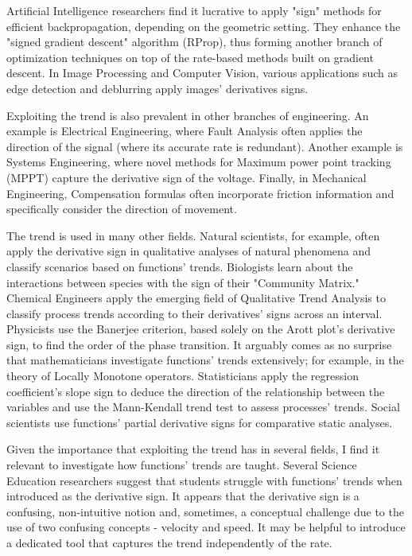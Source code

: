 \documentclass[11pt]{book}
\begin{document}
Artificial Intelligence researchers find it lucrative to apply "sign" methods for efficient backpropagation, depending on the geometric setting. They enhance the "signed gradient descent" algorithm (RProp), thus forming another branch of optimization techniques on top of the rate-based methods built on gradient descent. In Image Processing and Computer Vision, various applications such as edge detection and deblurring apply images' derivatives signs.

Exploiting the trend is also prevalent in other branches of engineering. An example is Electrical Engineering, where Fault Analysis often applies the direction of the signal (where its accurate rate is redundant). Another example is Systems Engineering, where novel methods for Maximum power point tracking (MPPT) capture the derivative sign of the voltage. Finally, in Mechanical Engineering, Compensation formulas often incorporate friction information and specifically consider the direction of movement.

The trend is used in many other fields. Natural scientists, for example, often apply the derivative sign in qualitative analyses of natural phenomena and classify scenarios based on functions' trends. Biologists learn about the interactions between species with the sign of their "Community Matrix." Chemical Engineers apply the emerging field of Qualitative Trend Analysis to classify process trends according to their derivatives' signs across an interval. Physicists use the Banerjee criterion, based solely on the Arott plot's derivative sign, to find the order of the phase transition. It arguably comes as no surprise that mathematicians investigate functions' trends extensively; for example, in the theory of Locally Monotone operators. Statisticians apply the regression coefficient's slope sign to deduce the direction of the relationship between the variables and use the Mann-Kendall trend test to assess processes' trends. Social scientists use functions' partial derivative signs for comparative static analyses. 

Given the importance that exploiting the trend has in several fields, I find it relevant to investigate how functions' trends are taught. Several Science Education researchers suggest that students struggle with functions' trends when introduced as the derivative sign. It appears that the derivative sign is a confusing, non-intuitive notion and, sometimes, a conceptual challenge due to the use of two confusing concepts - velocity and speed. It may be helpful to introduce a dedicated tool that captures the trend independently of the rate.
\end{document}
